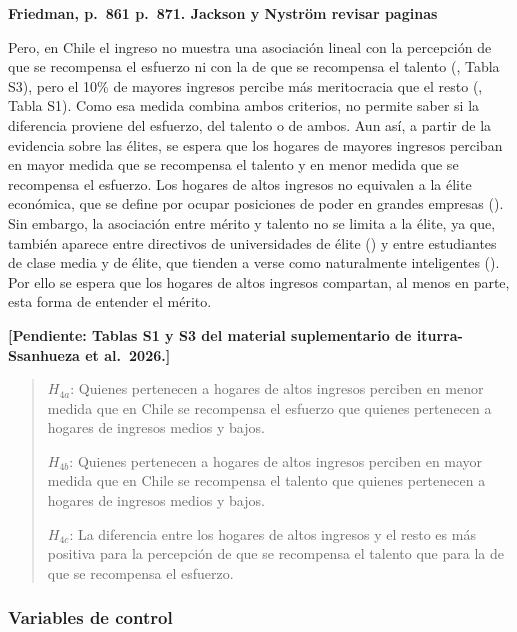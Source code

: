 \documentclass[
  spanish,
  a4paper,
  oneside]{scrbook}
\begin{document}
\textbf{Friedman, p.~861 p.~871. Jackson y Nyström revisar paginas}

Pero, en Chile el ingreso no muestra una asociación lineal con la
percepción de que se recompensa el esfuerzo ni con la de que se
recompensa el talento
(, Tabla S3), pero el 10\% de mayores ingresos percibe más
meritocracia que el resto
(, Tabla S1). Como esa medida combina ambos criterios, no permite
saber si la diferencia proviene del esfuerzo, del talento o de ambos.
Aun así, a partir de la evidencia sobre las élites, se espera que los
hogares de mayores ingresos perciban en mayor medida que se recompensa
el talento y en menor medida que se recompensa el esfuerzo. Los hogares
de altos ingresos no equivalen a la élite económica, que se define por
ocupar posiciones de poder en grandes empresas
(). Sin embargo, la asociación entre mérito y talento no se limita a
la élite, ya que, también aparece entre directivos de universidades de
élite () y entre estudiantes de clase media y de élite, que
tienden a verse como naturalmente inteligentes
().
Por ello se espera que los hogares de altos ingresos compartan, al menos
en parte, esta forma de entender el mérito.

\textbf{{[}Pendiente: Tablas S1 y S3 del material suplementario de
iturra-Ssanhueza et al.~2026.{]}}

\begin{quote}
\(H_{4a}\): Quienes pertenecen a hogares de altos ingresos perciben en
menor medida que en Chile se recompensa el esfuerzo que quienes
pertenecen a hogares de ingresos medios y bajos.

\(H_{4b}\): Quienes pertenecen a hogares de altos ingresos perciben en
mayor medida que en Chile se recompensa el talento que quienes
pertenecen a hogares de ingresos medios y bajos.

\(H_{4c}\): La diferencia entre los hogares de altos ingresos y el resto
es más positiva para la percepción de que se recompensa el talento que
para la de que se recompensa el esfuerzo.
\end{quote}

\subsubsection{Variables de control}\label{variables-de-control}
\end{document}
